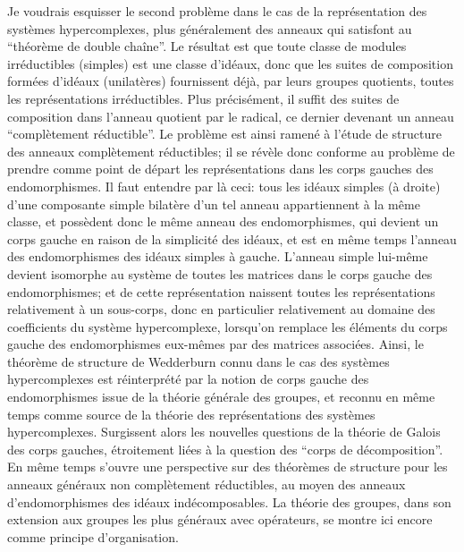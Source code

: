 Je voudrais esquisser le second problème dans le cas de la représentation des systèmes hypercomplexes, plus généralement des anneaux qui satisfont au ``théorème de double chaîne''. Le résultat est que toute classe de modules irréductibles (simples) est une classe d'idéaux, donc que les suites de composition formées d'idéaux (unilatères) fournissent déjà, par leurs groupes quotients, toutes les représentations irréductibles. Plus précisément, il suffit des suites de composition dans l'anneau quotient par le radical, ce dernier devenant un anneau ``complètement réductible''. Le problème est ainsi ramené à l'étude de structure des anneaux complètement réductibles; il se révèle donc conforme au problème de prendre comme point de départ les représentations dans les corps gauches des endomorphismes. Il faut entendre par là ceci: tous les idéaux simples (à droite) d'une composante simple bilatère d'un tel anneau appartiennent à la même classe, et possèdent donc le même anneau des endomorphismes, qui devient un corps gauche en raison de la simplicité des idéaux, et est en même temps l'anneau des endomorphismes des idéaux simples à gauche. L'anneau simple lui-même devient isomorphe au système de toutes les matrices dans le corps gauche des endomorphismes; et de cette représentation naissent toutes les représentations relativement à un sous-corps, donc en particulier relativement au domaine des coefficients du système hypercomplexe, lorsqu'on remplace les éléments du corps gauche des endomorphismes eux-mêmes par des matrices associées. Ainsi, le théorème de structure de Wedderburn connu dans le cas des systèmes hypercomplexes est réinterprété par la notion de corps gauche des endomorphismes issue de la théorie générale des groupes, et reconnu en même temps comme source de la théorie des représentations des systèmes hypercomplexes. Surgissent alors les nouvelles questions de la théorie de Galois des corps gauches, étroitement liées à la question des ``corps de décomposition''. En même temps s'ouvre une perspective sur des théorèmes de structure pour les anneaux généraux non complètement réductibles, au moyen des anneaux d'endomorphismes des idéaux indécomposables. La théorie des groupes, dans son extension aux groupes les plus généraux avec opérateurs, se montre ici encore comme principe d'organisation.

\endgroup
